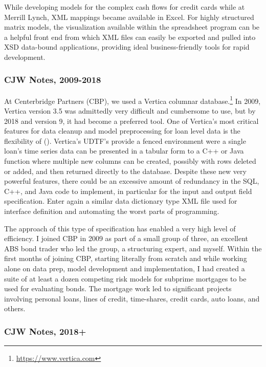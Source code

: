 \documentclass[10pt]{article}
\begin{document}
While developing models for the complex cash flows for credit cards while at Merrill Lynch, XML mappings became available in Excel.  
For highly structured matrix models, the visualization available within the spreadsheet program can be a helpful front end from which
XML files can easily be exported and pulled into XSD data-bound applications, providing ideal business-friendly tools for rapid development.


\subsubsection{CJW Notes, 2009-2018}

At Centerbridge Partners (CBP), we used a Vertica columnar database.\footnote{\url{https://www.vertica.com}} In 2009, Vertica version 3.5 was
admittedly very difficult and cumbersome to use, but by 2018 and version 9, it had become a preferred tool.  One of Vertica's most critical
features for data cleanup and model preprocessing for loan level data is the flexibility of 
().  Vertica's UDTF's provide a fenced environment were a single loan's time series data can be presented in a tabular form
to a C++ or Java function where multiple new columns can be created, possibly with rows deleted or added, and then returned directly to the
database.  Despite these new very powerful features, there could be an excessive amount of redundancy in the SQL, C++, and Java code to
implement, in particular for the input and output field specification.  Enter again a similar data dictionary type XML file used for
interface definition and automating the worst parts of programming.

The approach of this type of specification has enabled a very high level of efficiency.
I joined CBP in 2009 as part of a small group of three, an excellent ABS bond trader who led the group, a structuring expert, and myself. 
Within the first months of joining CBP, starting literally from scratch and while working alone on data prep, model development and implementation, 
I had created a suite of at least a dozen competing risk models for subprime mortgages to be used for evaluating bonds.
The mortgage work led to significant projects involving personal loans, lines of credit, time-shares, credit cards, auto loans, and others.

\subsubsection{CJW Notes, 2018+}
\end{document}
